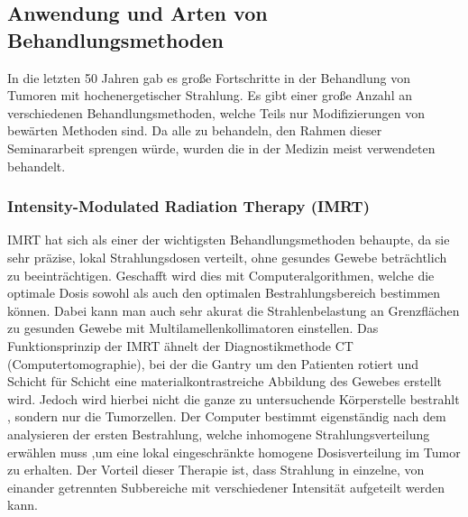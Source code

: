 


\subsection{Anwendung und Arten von Behandlungsmethoden}
In die letzten 50 Jahren gab es große Fortschritte in der Behandlung von Tumoren mit hochenergetischer Strahlung.
Es gibt einer große Anzahl an verschiedenen Behandlungsmethoden, welche Teils nur Modifizierungen von bewärten Methoden sind.
Da alle zu behandeln, den Rahmen dieser Seminararbeit sprengen würde, wurden die in der Medizin meist verwendeten behandelt.
\subsubsection{Intensity-Modulated Radiation Therapy (IMRT)}
IMRT hat sich als einer der wichtigsten Behandlungsmethoden behaupte, da sie sehr präzise, lokal Strahlungsdosen verteilt, ohne gesundes Gewebe beträchtlich zu beeinträchtigen.
Geschafft wird dies mit Computeralgorithmen, welche die optimale Dosis sowohl als auch den optimalen Bestrahlungsbereich bestimmen können.
Dabei kann man auch sehr akurat die Strahlenbelastung an Grenzflächen zu gesunden Gewebe mit Multilamellenkollimatoren einstellen.
Das Funktionsprinzip der IMRT ähnelt der Diagnostikmethode CT (Computertomographie), bei der die Gantry um den Patienten rotiert und Schicht für Schicht eine materialkontrastreiche Abbildung des Gewebes erstellt wird.
Jedoch wird hierbei nicht die ganze zu untersuchende Körperstelle bestrahlt , sondern nur die Tumorzellen.
Der Computer bestimmt eigenständig nach dem analysieren der ersten Bestrahlung, welche inhomogene Strahlungsverteilung erwählen muss ,um eine lokal eingeschränkte homogene Dosisverteilung im Tumor zu erhalten. \cite{teh1999intensity}
Der Vorteil dieser Therapie ist, dass Strahlung in einzelne, von einander getrennten Subbereiche mit verschiedener Intensität aufgeteilt werden kann.
